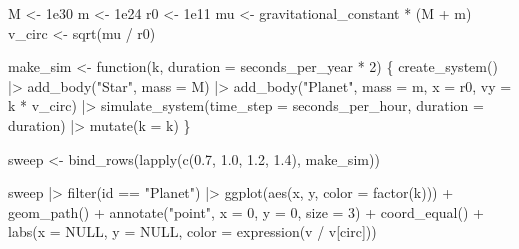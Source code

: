 \documentclass[
  10.5pt,
  letterpaper,
]{scrbook}
\newenvironment{Shaded}{\begin{snugshade}}{\end{snugshade}}
\newcommand{\AttributeTok}[1]{\textcolor[rgb]{0.00,0.00,0.00}{#1}}
\newcommand{\ConstantTok}[1]{\textcolor[rgb]{0.00,0.00,0.00}{#1}}
\newcommand{\ControlFlowTok}[1]{\textcolor[rgb]{0.00,0.00,0.00}{#1}}
\newcommand{\DecValTok}[1]{\textcolor[rgb]{0.00,0.00,0.00}{#1}}
\newcommand{\FloatTok}[1]{\textcolor[rgb]{0.00,0.00,0.00}{#1}}
\newcommand{\FunctionTok}[1]{\textcolor[rgb]{0.00,0.00,0.00}{#1}}
\newcommand{\NormalTok}[1]{\textcolor[rgb]{0.00,0.00,0.00}{#1}}
\newcommand{\OtherTok}[1]{\textcolor[rgb]{0.00,0.00,0.00}{#1}}
\newcommand{\SpecialCharTok}[1]{\textcolor[rgb]{0.00,0.00,0.00}{#1}}
\newcommand{\StringTok}[1]{\textcolor[rgb]{0.00,0.00,0.00}{#1}}
\theoremstyle{plain}
\theoremstyle{remark}
\begin{document}
\begin{Shaded}
\begin{Highlighting}[]
\NormalTok{M  }\OtherTok{\textless{}{-}} \FloatTok{1e30}
\NormalTok{m  }\OtherTok{\textless{}{-}} \FloatTok{1e24}
\NormalTok{r0 }\OtherTok{\textless{}{-}} \FloatTok{1e11}
\NormalTok{mu }\OtherTok{\textless{}{-}}\NormalTok{ gravitational\_constant }\SpecialCharTok{*}\NormalTok{ (M }\SpecialCharTok{+}\NormalTok{ m)}
\NormalTok{v\_circ }\OtherTok{\textless{}{-}} \FunctionTok{sqrt}\NormalTok{(mu }\SpecialCharTok{/}\NormalTok{ r0)}

\NormalTok{make\_sim }\OtherTok{\textless{}{-}} \ControlFlowTok{function}\NormalTok{(k, }\AttributeTok{duration =}\NormalTok{ seconds\_per\_year }\SpecialCharTok{*} \DecValTok{2}\NormalTok{) \{}
  \FunctionTok{create\_system}\NormalTok{() }\SpecialCharTok{|\textgreater{}}
    \FunctionTok{add\_body}\NormalTok{(}\StringTok{"Star"}\NormalTok{,   }\AttributeTok{mass =}\NormalTok{ M) }\SpecialCharTok{|\textgreater{}}
    \FunctionTok{add\_body}\NormalTok{(}\StringTok{"Planet"}\NormalTok{, }\AttributeTok{mass =}\NormalTok{ m, }\AttributeTok{x =}\NormalTok{ r0, }\AttributeTok{vy =}\NormalTok{ k }\SpecialCharTok{*}\NormalTok{ v\_circ) }\SpecialCharTok{|\textgreater{}}
    \FunctionTok{simulate\_system}\NormalTok{(}\AttributeTok{time\_step =}\NormalTok{ seconds\_per\_hour, }\AttributeTok{duration =}\NormalTok{ duration) }\SpecialCharTok{|\textgreater{}}
    \FunctionTok{mutate}\NormalTok{(}\AttributeTok{k =}\NormalTok{ k)}
\NormalTok{\}}

\NormalTok{sweep }\OtherTok{\textless{}{-}} \FunctionTok{bind\_rows}\NormalTok{(}\FunctionTok{lapply}\NormalTok{(}\FunctionTok{c}\NormalTok{(}\FloatTok{0.7}\NormalTok{, }\FloatTok{1.0}\NormalTok{, }\FloatTok{1.2}\NormalTok{, }\FloatTok{1.4}\NormalTok{), make\_sim))}
\end{Highlighting}
\end{Shaded}

\begin{Shaded}
\begin{Highlighting}[]
\NormalTok{sweep }\SpecialCharTok{|\textgreater{}}
  \FunctionTok{filter}\NormalTok{(id }\SpecialCharTok{==} \StringTok{"Planet"}\NormalTok{) }\SpecialCharTok{|\textgreater{}}
  \FunctionTok{ggplot}\NormalTok{(}\FunctionTok{aes}\NormalTok{(x, y, }\AttributeTok{color =} \FunctionTok{factor}\NormalTok{(k))) }\SpecialCharTok{+}
  \FunctionTok{geom\_path}\NormalTok{() }\SpecialCharTok{+}
  \FunctionTok{annotate}\NormalTok{(}\StringTok{"point"}\NormalTok{, }\AttributeTok{x =} \DecValTok{0}\NormalTok{, }\AttributeTok{y =} \DecValTok{0}\NormalTok{, }\AttributeTok{size =} \DecValTok{3}\NormalTok{) }\SpecialCharTok{+}
  \FunctionTok{coord\_equal}\NormalTok{() }\SpecialCharTok{+}
  \FunctionTok{labs}\NormalTok{(}\AttributeTok{x =} \ConstantTok{NULL}\NormalTok{, }\AttributeTok{y =} \ConstantTok{NULL}\NormalTok{, }\AttributeTok{color =} \FunctionTok{expression}\NormalTok{(v }\SpecialCharTok{/}\NormalTok{ v[circ]))}
\end{Highlighting}
\end{Shaded}
\end{document}
